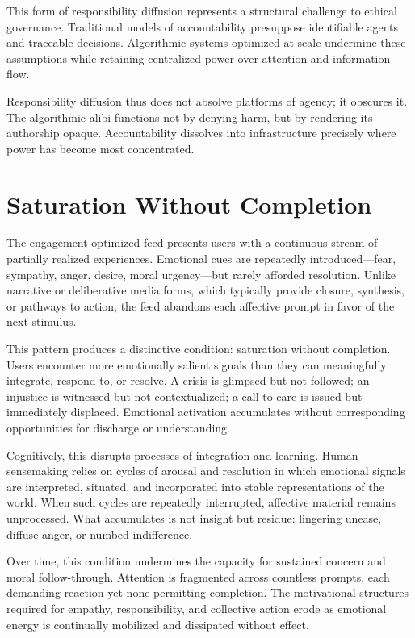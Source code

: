 \documentclass[12pt]{article}
\begin{document}
This form of responsibility diffusion represents a structural challenge to ethical governance. Traditional models of accountability presuppose identifiable agents and traceable decisions. Algorithmic systems optimized at scale undermine these assumptions while retaining centralized power over attention and information flow.

Responsibility diffusion thus does not absolve platforms of agency; it obscures it. The algorithmic alibi functions not by denying harm, but by rendering its authorship opaque. Accountability dissolves into infrastructure precisely where power has become most concentrated.

\section{Saturation Without Completion}

The engagement-optimized feed presents users with a continuous stream of partially realized experiences. Emotional cues are repeatedly introduced—fear, sympathy, anger, desire, moral urgency—but rarely afforded resolution. Unlike narrative or deliberative media forms, which typically provide closure, synthesis, or pathways to action, the feed abandons each affective prompt in favor of the next stimulus.

This pattern produces a distinctive condition: saturation without completion. Users encounter more emotionally salient signals than they can meaningfully integrate, respond to, or resolve. A crisis is glimpsed but not followed; an injustice is witnessed but not contextualized; a call to care is issued but immediately displaced. Emotional activation accumulates without corresponding opportunities for discharge or understanding.

Cognitively, this disrupts processes of integration and learning. Human sensemaking relies on cycles of arousal and resolution in which emotional signals are interpreted, situated, and incorporated into stable representations of the world. When such cycles are repeatedly interrupted, affective material remains unprocessed. What accumulates is not insight but residue: lingering unease, diffuse anger, or numbed indifference.

Over time, this condition undermines the capacity for sustained concern and moral follow-through. Attention is fragmented across countless prompts, each demanding reaction yet none permitting completion. The motivational structures required for empathy, responsibility, and collective action erode as emotional energy is continually mobilized and dissipated without effect.
\end{document}
